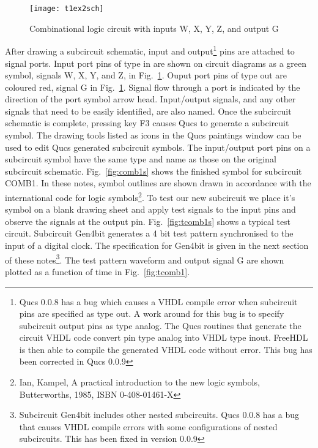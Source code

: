 \begin{figure}
  \centering
  \texttt{[image: t1ex2sch]}
  \caption{Combinational logic circuit with inputs W, X, Y, Z, and output G}
  \label{fig:t1ex2sch}
\end{figure}
\FloatBarrier

After drawing a subcircuit schematic, input and output\footnote{Qucs
  0.0.8 has a bug which causes a VHDL compile error when subcircuit
  pins are specified as type out. A work around for this bug is to
  specify subcircuit output pins as type analog.  The Qucs routines
  that generate the circuit VHDL code convert pin type analog into
  VHDL type inout. FreeHDL is then able to compile the generated VHDL
  code without error. This bug has been corrected in Qucs 0.0.9} pins
are attached to signal ports.  Input port pins of type in are shown on
circuit diagrams as a green symbol, signals W, X, Y, and Z, in
Fig.~\ref{fig:t1ex2sch}.  Ouput port pins of type out are coloured
red, signal G in Fig.~\ref{fig:t1ex2sch}. Signal flow through a port
is indicated by the direction of the port symbol arrow
head. Input/output signals, and any other signals that need to be
easily identified, are also named.  Once the subcircuit schematic is
complete, pressing key F3 causes Qucs to generate a subcircuit symbol.
The drawing tools listed as icons in the Qucs paintings window can be
used to edit Qucs generated subcircuit symbols.  The input/output port
pins on a subcircuit symbol have the same type and name as those on
the original subcircuit schematic.  Fig.~\ref{fig:comb1s} shows the
finished symbol for subcircuit COMB1. In these notes, symbol outlines
are shown drawn in accordance with the international code for logic
symbols\footnote{Ian, Kampel, A practical introduction to the new
  logic symbols, Butterworths, 1985, ISBN 0-408-01461-X}. To test our
new subcircuit we place it's symbol on a blank drawing sheet and apply
test signals to the input pins and observe the signals at the output
pin.  Fig.~\ref{fig:tcomb1s} shows a typical test circuit.  Subcircuit
Gen4bit generates a 4 bit test pattern synchronised to the input of a
digital clock. The specification for Gen4bit is given in the next
section of these notes\footnote{Subcircuit Gen4bit includes other
  nested subcircuits.  Qucs 0.0.8 has a bug that causes VHDL compile
  errors with some configurations of nested subcircuits. This has been
  fixed in version 0.0.9 }.  The test pattern waveform and output
signal G are shown plotted as a function of time in
Fig.~\ref{fig:tcomb1}.

